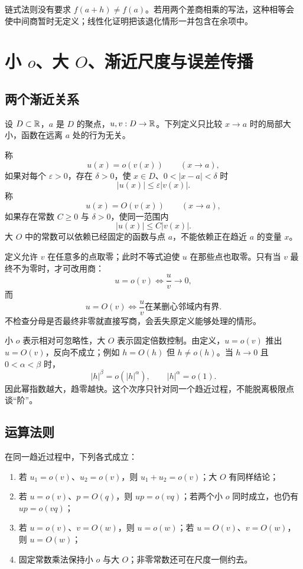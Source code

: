 链式法则没有要求 \(f(a+h)\ne f(a)\)。若用两个差商相乘的写法，这种相等会使中间商暂时无定义；线性化证明把该退化情形一并包含在余项中。

\section{小 \texorpdfstring{\(o\)}{o}、大 \texorpdfstring{\(O\)}{O}、渐近尺度与误差传播}
\label{sec:asymptotic-notation-error-propagation}

\subsection{两个渐近关系}

设 \(D\subset\mathbb{R}\)，\(a\) 是 \(D\) 的聚点，\(u,v:D\to\mathbb{R}\)。下列定义只比较 \(x\to a\) 时的局部大小，函数在远离 \(a\) 处的行为无关。

\begin{definition}[小 \(o\) 与大 \(O\)]
\label{def:little-o-big-o}
称
\[
 u(x)=o(v(x))\qquad(x\to a),
\]
如果对每个 \(\varepsilon>0\)，存在 \(\delta>0\)，使 \(x\in D\)、\(0<|x-a|<\delta\) 时
\[
 |u(x)|\le\varepsilon |v(x)|.
\]
称
\[
 u(x)=O(v(x))\qquad(x\to a),
\]
如果存在常数 \(C\ge0\) 与 \(\delta>0\)，使同一范围内
\[
 |u(x)|\le C|v(x)|.
\]
大 \(O\) 中的常数可以依赖已经固定的函数与点 \(a\)，不能依赖正在趋近 \(a\) 的变量 \(x\)。
\end{definition}

定义允许 \(v\) 在任意多的点取零；此时不等式迫使 \(u\) 在那些点也取零。只有当 \(v\) 最终不为零时，才可改用商：
\[
 u=o(v)\iff \frac uv\to0,
\]
而
\[
 u=O(v)\iff \frac uv
 \text{在某删心邻域内有界}.
\]
不检查分母是否最终非零就直接写商，会丢失原定义能够处理的情形。

小 \(o\) 表示相对可忽略性，大 \(O\) 表示固定倍数控制。由定义，\(u=o(v)\) 推出 \(u=O(v)\)，反向不成立；例如 \(h=O(h)\) 但 \(h\ne o(h)\)。当 \(h\to0\) 且 \(0<\alpha<\beta\) 时，
\[
 |h|^\beta=o(|h|^\alpha),
 \qquad |h|^\alpha=o(1).
\]
因此幂指数越大，趋零越快。这个次序只针对同一个趋近过程，不能脱离极限点谈“阶”。

\subsection{运算法则}

\begin{proposition}[渐近运算]
在同一趋近过程中，下列各式成立：
\begin{enumerate}
 \item 若 \(u_1=o(v)\)、\(u_2=o(v)\)，则 \(u_1+u_2=o(v)\)；大 \(O\) 有同样结论；
 \item 若 \(u=o(v)\)、\(p=O(q)\)，则 \(up=o(vq)\)；若两个小 \(o\) 同时成立，也仍有 \(up=o(vq)\)；
 \item 若 \(u=o(v)\)、\(v=O(w)\)，则 \(u=o(w)\)；若 \(u=O(v)\)、\(v=O(w)\)，则 \(u=O(w)\)；
 \item 固定常数乘法保持小 \(o\) 与大 \(O\)；非零常数还可在尺度一侧约去。
\end{enumerate}
\end{proposition}

